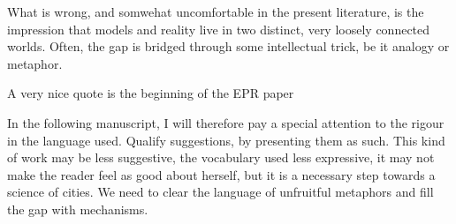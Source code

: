 What is wrong, and somwehat uncomfortable in the present literature, is the
impression that models and reality live in two distinct, very loosely connected
worlds. Often, the gap is bridged through some intellectual trick, be it analogy
or metaphor.

A very nice quote is the beginning of the EPR paper

In the following manuscript, I will therefore pay a special attention to the
rigour in the language used. Qualify suggestions, by presenting them as such.
This kind of work may be less suggestive, the vocabulary used less expressive,
it may not make the reader feel as good about herself, but it is a necessary
step towards a science of cities. We need to clear the language of unfruitful
metaphors and fill the gap with mechanisms.
